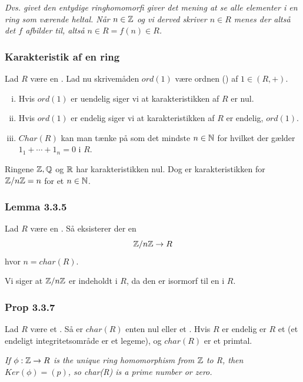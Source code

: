 \textit{Dvs. givet den entydige ringhomomorfi giver det mening at se alle
elementer i en ring som værende heltal. Når $n \in \mathbb{Z}$ og vi derved skriver $n
\in R$ menes der altså det $f$ afbilder til, altså $n \in R = f(n) \in R$.}

\subsubsection{Karakteristik af en ring}
\label{Karakteristik af en ring}
Lad $R$ være en . Lad nu skrivemåden $ord(1)$ være ordnen
() af $1 \in (R, +)$.
\begin{enumerate}[(i)]
  \item Hvis $ord(1)$ er uendelig siger vi at karakteristikken af $R$ er nul.
  \item Hvis $ord(1)$ er endelig siger vi at karakteristikken af $R$ er
  endelig, $ord(1)$.
  \item $Char(R)$ kan man tænke på som det mindste $n \in \mathbb{N}$ for hvilket der
  gælder $1_1 + \cdots + 1_n = 0$ i $R$. 
\end{enumerate}

Ringene $\mathbb{Z}, \mathbb{Q}$ og $\mathbb{R}$ har karakteristikken nul. Dog er karakteristikken for
$\mathbb{Z}/n\mathbb{Z} = n$ for et $n \in \mathbb{N}$.

\subsubsection{Lemma 3.3.5}
\label{Lemma 3.3.5}
Lad $R$ være en . Så eksisterer der en 
\begin{equation*}
  \mathbb{Z}/n\mathbb{Z} \rightarrow R
\end{equation*}
hvor $n = char(R)$.

Vi siger at $\mathbb{Z}/n\mathbb{Z}$ er indeholdt i $R$, da den er isormorf til en
 i $R$.

\subsubsection{Prop 3.3.7}
\label{Prop 3.3.7}
Lad $R$ være et . Så er $char(R)$ enten nul eller
et . Hvis $R$ er endelig er $R$ et  (et
endeligt integritetsområde er et legeme), og $char(R)$ er et primtal.

\textit{If $\phi: \mathbb{Z} \to R$ is the unique ring homomorphism from $\mathbb{Z}$ to R,
then $Ker(\phi) = (p)$, so char(R) is a prime number or zero.}


